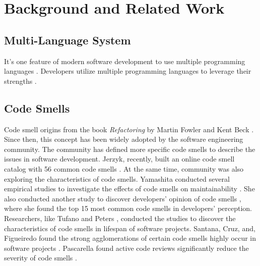 \section{Background and Related Work}
\label{sec:background}

\subsection{Multi-Language System}
\label{sec:Multi-Language System}

It's one feature of modern software development to use multiple programming languages \cite{723183}.
Developers utilize multiple programming languages to leverage their strengths \cite{7476675}.


\subsection{Code Smells}
\label{sec:Code Smells}
Code smell origins from the book \textit{Refactoring} by Martin Fowler and Kent Beck \cite{Fowler_Beck}.
Since then, this concept has been widely adopted by the software engineering community. The community has
defined more specific code smells \cite{Pysmell} \cite{CleanCode} \cite{SQLAntipatterns} 
\cite{RefactoringWorkbook} to describe the issues in software development. Jerzyk, recently, built
an online code smell catalog with 56 common code smells \cite{Jerzyk2023}.
At the same time, community was also exploring the characteristics of code smells. Yamashita 
conducted several empirical studies to investigate the effects of code smells on maintainability \cite{6405287} \cite{6392174}. She
also conducted another study to discover developers' opinion of code smells \cite{developersCare}, where 
she found the top 15 most common code smells in developers' perception. Researchers, like Tufano \cite{whenandwhy} and Peters \cite{lifespan}, conducted the studies to
discover the characteristics of code smells in lifespan of software projects. Santana, Cruz, and, Figueiredo found the
strong agglomerations of certain code smells highly occur in software projects \cite{Santana}. Pascarella found active code reviews significantly reduce the severity of code smells \cite{Pascarella}.

